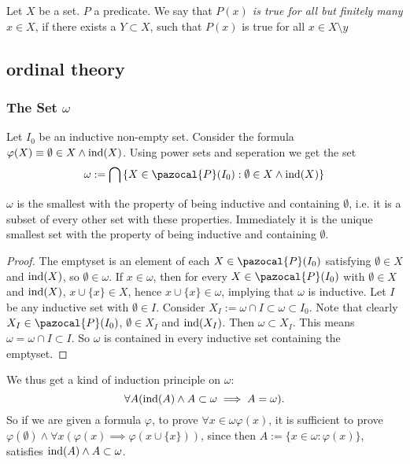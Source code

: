 \begin{definition}
    Let $X$ be a set. $P$ a predicate. We say that \textit{$P(x)$ is true for all but finitely many $x\in X$}, if there exists a $Y\subset X$, such that $P(x)$ is true for all $x\in X\setminus y$
\end{definition}
\subsection{ordinal theory}
\subsubsection{The Set $\omega$}
    \begin{definition}
        Let $I_0$ be an inductive non-empty set. Consider the formula $\varphi(X) \equiv  \emptyset\in X \wedge \mathrm{ind}(X)$. Using power sets and seperation we get the set 
        $$ \omega := \bigcap \left\{X\in \pazocal{P}(I_0) : \emptyset \in X\wedge \ind(X)\right\}$$
    \end{definition}
    \begin{lemma}
        $\omega$ is the smallest with the property of being inductive and containing $\emptyset$, i.e. it is a subset of every other set with these properties. Immediately it is the unique smallest set with the property of being inductive and containing $\emptyset$.
    \end{lemma}
    \begin{proof}
        The emptyset is an element of each $X\in\pazocal{P}(I_0)$ satisfying $\emptyset \in X$ and $\mathrm{ind}(X)$, so $\emptyset\in \omega$. If $x\in \omega$, then for every $X\in\pazocal{P}(I_0)$ with $\emptyset \in X$ and $\mathrm{ind}(X)$, $x\cup \{x\}\in X$, hence $x\cup \{x\}\in \omega$, implying that $\omega$ is inductive. Let $I$ be any inductive set with $\emptyset \in I$. Consider $X_I := \omega \cap I \subset \omega\subset I_0$. Note that clearly $X_I\in \pazocal{P}(I_0)$, $\emptyset \in X_I$ and $\mathrm{ind}(X_I)$. Then $\omega \subset X_I$. This means $\omega = \omega \cap I\subset I$. So $\omega$ is contained in every inductive set containing the emptyset.
    \end{proof}
   We thus get a kind of induction principle on $\omega$: 
   $$\forall A(\mathrm{ind}(A) \wedge A\subset \omega\implies A=\omega).$$
   So if we are given a formula $\varphi$, to prove $\forall x\in \omega\varphi(x)$, it is sufficient to prove $\varphi(\emptyset) \wedge \forall x(\varphi(x)\implies \varphi(x\cup\{x\}))$, since then $A:= \{x\in \omega  : \varphi(x)\}$, satisfies $\mathrm{ind}(A) \wedge A\subset \omega$.

